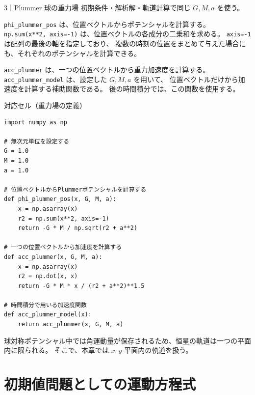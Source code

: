 \begin{notebookblock}{3｜Plummer 球の重力場}
初期条件・解析解・軌道計算で同じ $G,M,a$ を使う。

\texttt{phi\_plummer\_pos} は、位置ベクトルからポテンシャルを計算する。
\texttt{np.sum(x**2, axis=-1)} は、位置ベクトルの各成分の二乗和を求める。
\texttt{axis=-1} は配列の最後の軸を指定しており、
複数の時刻の位置をまとめて与えた場合にも、それぞれのポテンシャルを計算できる。

\texttt{acc\_plummer} は、一つの位置ベクトルから重力加速度を計算する。
\texttt{acc\_plummer\_model} は、設定した $G,M,a$ を用いて、
位置ベクトルだけから加速度を計算する補助関数である。
後の時間積分では、この関数を使用する。

\par\smallskip\noindent\begin{minipage}{\linewidth}
{\sffamily\small\color{graytext}対応セル（重力場の定義）}
\begin{Verbatim}[xleftmargin=2mm,fontsize=\small,frame=single,framesep=1.8mm,framerule=0.35pt,rulecolor=\color{listingframe},fillcolor=\color{listingbg}]
import numpy as np

# 無次元単位を設定する
G = 1.0
M = 1.0
a = 1.0

# 位置ベクトルからPlummerポテンシャルを計算する
def phi_plummer_pos(x, G, M, a):
    x = np.asarray(x)
    r2 = np.sum(x**2, axis=-1)
    return -G * M / np.sqrt(r2 + a**2)

# 一つの位置ベクトルから加速度を計算する
def acc_plummer(x, G, M, a):
    x = np.asarray(x)
    r2 = np.dot(x, x)
    return -G * M * x / (r2 + a**2)**1.5

# 時間積分で用いる加速度関数
def acc_plummer_model(x):
    return acc_plummer(x, G, M, a)
\end{Verbatim}
\end{minipage}

\end{notebookblock}

球対称ポテンシャル中では角運動量が保存されるため、恒星の軌道は一つの平面内に限られる。
そこで、本章では $x$--$y$ 平面内の軌道を扱う。

\section{初期値問題としての運動方程式}
\label{sec:ch3-ode}


